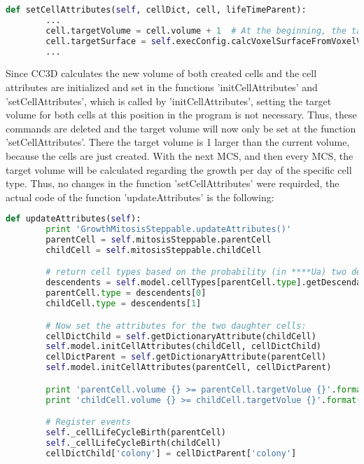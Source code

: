 \begin{lstlisting}[language=Python, caption=set the target volume as well as the target surface in the intended function]
    def setCellAttributes(self, cellDict, cell, lifeTimeParent):
		...
        cell.targetVolume = cell.volume + 1  # At the beginning, the target is the actual size.
        cell.targetSurface = self.execConfig.calcVoxelSurfaceFromVoxelVolume(cell.targetVolume)
        ...
\end{lstlisting}
Since \ac{CC3D} calculates the new volume of both created cells and the cell attributes are initialized and set in the functions 'initCellAttributes' and 'setCellAttributes', which is called by 'initCellAttributes', setting the target volume for both cells at this position in the program is not necessary. Thus, these commands are deleted and the target volume will now only be set at the function 'setCellAttributes'. There the target volume is 1 larger than the current volume, because the cells are just created. With the next \ac{MCS}, and then every \ac{MCS}, the target volume will be calculated regarding the growth per day of the specific cell type. Thus, no changes in the function 'setCellAttributes' were requirded, the actual code of the function 'updateAttributes' is the following:

\begin{lstlisting}[language=Python, caption = two cells are created\, due to mitosis]
    def updateAttributes(self):
        print 'GrowthMitosisSteppable.updateAttributes()'
        parentCell = self.mitosisSteppable.parentCell
        childCell = self.mitosisSteppable.childCell

        # return cell types based on the probability (in ****Ua) two descendents of the current cell
        descendents = self.model.cellTypes[parentCell.type].getDescendants()
        parentCell.type = descendents[0]
        childCell.type = descendents[1]

        # Now set the attributes for the two daughter cells:
        cellDictChild = self.getDictionaryAttribute(childCell)
        self.model.initCellAttributes(childCell, cellDictChild)
        cellDictParent = self.getDictionaryAttribute(parentCell)
        self.model.initCellAttributes(parentCell, cellDictParent)

        print 'parentCell.volume {} >= parentCell.targetVolue {}'.format(parentCell.volume, parentCell.targetVolume)
        print 'childCell.volume {} >= childCell.targetVolue {}'.format(childCell.volume, childCell.targetVolume)

        # Register events
        self._cellLifeCycleBirth(parentCell)
        self._cellLifeCycleBirth(childCell)
        cellDictChild['colony'] = cellDictParent['colony']
\end{lstlisting}























